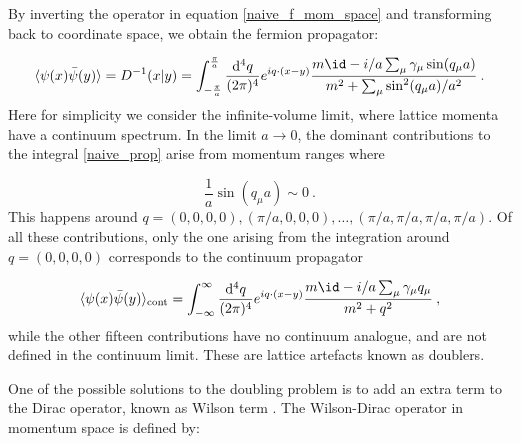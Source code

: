 By inverting  the operator in equation \ref{naive_f_mom_space} and transforming back to coordinate space, we obtain the fermion propagator:

\begin{equation}
\langle \psi(x) \bar \psi(y) \rangle = D^{-1}(x \vert y) = \int_{-\frac{\pi}{a}}^{\frac{\pi}{a}} \frac{\mathrm{d}^4 q}{(2 \pi)^4} e^{iq\cdot (x-y)}  \frac{m \id -i/a \sum_{\mu} \gamma_{\mu} \sin (q_{\mu} a)}{m^2 + \sum_{\mu}  \sin^2(q_{\mu}a)/a^2} \: .
\label{naive_prop}
\end{equation}
%
Here for simplicity we consider the infinite-volume limit, where lattice momenta have a continuum spectrum. In the limit $a \to 0$, the dominant contributions to the integral \ref{naive_prop} arise from momentum ranges where

\begin{equation}
\frac{1}{a} \sin(q_{\mu}a) \sim 0 \: .
\end{equation}
%
This happens around $q = (0,0,0,0), (\pi/a,0,0,0), \dots , (\pi/a,\pi/a,\pi/a,\pi/a)$. Of all these contributions, only the one arising from the integration around $q = (0,0,0,0)$ corresponds to the continuum propagator

\begin{equation}
\langle \psi(x) \bar \psi(y) \rangle_{\mathrm{cont}} = \int_{-\infty}^{\infty} \frac{\mathrm{d}^4 q}{(2 \pi)^4} e^{iq\cdot (x-y)}  \frac{m \id -i/a \sum_{\mu} \gamma_{\mu} q_{\mu}}{m^2 +  q^2} \: ,
\end{equation}
%
while the other fifteen contributions have no continuum analogue, and are not defined in the continuum limit. These are lattice artefacts known as doublers.  


One of the possible solutions to the doubling problem is to add an extra term to the Dirac operator, known as Wilson term \cite{Wilson:1975id}. The Wilson-Dirac operator in momentum space is defined by:

